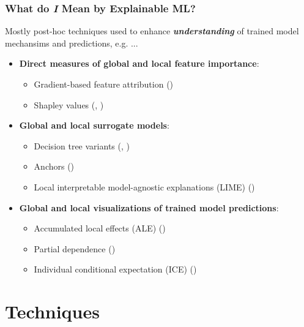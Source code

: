 \documentclass[11pt,aspectratio=169,hyperref={colorlinks}]{beamer}
\begin{document}
	\begin{frame}
	
		\frametitle{What do \textit{\textbf{I}} Mean by Explainable ML?}

		Mostly post-hoc techniques used to enhance \textit{\textbf{understanding}} of trained model mechansims and predictions, e.g. ...
		\begin{itemize}
			\item \textbf{Direct measures of global and local feature importance}: 
			\begin{itemize}\footnotesize
				\item Gradient-based feature attribution (\citet{grad_attr})
				\item Shapley values (\citet{shapley}, \citet{shapley1953value})
			\end{itemize}
			\item \textbf{Global and local surrogate models}: 
			\begin{itemize}\footnotesize
				\item Decision tree variants (\citet{viper}, \citet{dt_surrogate1})
				\item Anchors (\citet{anchors})
				\item Local interpretable model-agnostic explanations (LIME) (\citet{lime})
			\end{itemize}
			\item \textbf{Global and local visualizations of trained model predictions}: 
			\begin{itemize}\footnotesize
				\item Accumulated local effects (ALE) (\citet{ale_plot}) 
				\item Partial dependence (\citet{esl})
				\item Individual conditional expectation (ICE) (\citet{ice_plots})
			\end{itemize}
		\end{itemize}\normalsize
			
	\end{frame}

	\section{Techniques}
	
	\subsection*{} %
\end{document}
